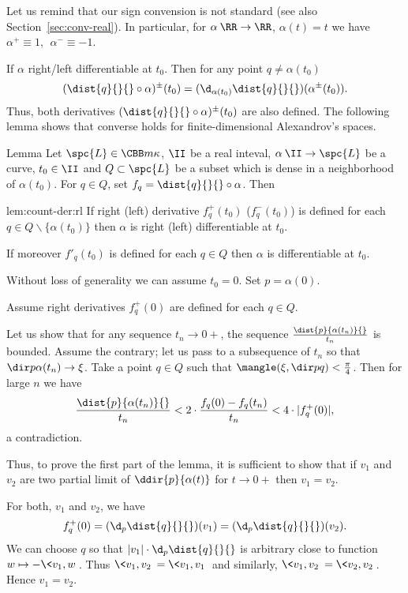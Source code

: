 Let us remind that our sign convension is not standard (see also Section~\ref{sec:conv-real}). 
In particular, for $\alpha\:\RR\to \RR$, $\alpha(t)=t$ we have $\alpha^+\equiv 1,\ \ \alpha^-\equiv -1$.

If $\alpha$ right/left differentiable at $t_0$.
Then for any point $q\not=\alpha(t_0)$
\[(\dist{q}{}{}\circ\alpha)^\pm(t_0)
=
(\d_{\alpha(t_0)}\dist{q}{}{})(\alpha^\pm(t_0)).\]
Thus, both derivatives $(\dist{q}{}{}\circ\alpha)^\pm(t_0)$ are also defined.
The following lemma shows that converse holds for finite-dimensional Alexandrov's spaces.


\begin{thm}{Lemma}\label{lem:count-der}
Let $\spc{L}\in\CBB m\kappa$,
$\II$ be a real inteval,
$\alpha\:\II\to \spc{L}$ be a curve,
$t_0\in\II$ 
and $Q\subset \spc{L}$ be a subset which is dense in a neighborhood of $\alpha(t_0)$.
For $q\in Q$, set $f_q=\dist{q}{}{}\circ\alpha$.
Then 
\begin{subthm}{lem:count-der:rl}
If right (left) derivative $f^+_q(t_0)$ ($f^-_q(t_0)$) is defined for each $q\in Q\backslash \{\alpha(t_0)\}$ then $\alpha$ is right (left) differentiable at $t_0$.
\end{subthm}

\begin{subthm}{} If moreover $f'_q(t_0)$ is defined for each $q\in Q$ then $\alpha$ is differentiable at $t_0$.
\end{subthm}
\end{thm}



Without loss of generality we can assume $t_0=0$. Set $p=\alpha(0)$.

Assume right derivatives $f^+_q(0)$ are defined for each $q\in Q$.

Let us show that for any sequence $t_n\to 0+$, the sequence $\frac{\dist{p}{\alpha(t_n)}{}}{t_n}$ is bounded.
Assume the contrary;
let us pass to a subsequence of $t_n$ so that $\dir p{\alpha(t_n)}\to\xi$.
Take a point $q\in Q$ such that $\mangle(\xi,\dir p q)<\tfrac\pi4$.
Then for large $n$ we have 
\[\frac{\dist{p}{\alpha(t_n)}{}}{t_n}
<
2\cdot\frac{f_q(0)-f_q(t_n)}{t_n}
<
4\cdot|f^+_q(0)|,\] a 
contradiction.

Thus, to prove the first part of the lemma, 
it is sufficient to show that if $v_1$ and $v_2$ are two partial limit of $\ddir{p}{\alpha(t)}$ for $t\to 0+$ then $v_1=v_2$.

For both, $v_1$ and $v_2$, we have
\[f_q^+(0)=(\d_p\dist{q}{}{})(v_1)=(\d_p\dist{q}{}{})(v_2).\]
We can choose $q$ so that $|v_1|\cdot\d_p\dist{q}{}{}$ is arbitrary close to function $w\mapsto -\<v_1,w\>$.
Thus $\<v_1,v_2\>=\<v_1,v_1\>$ and similarly, $\<v_1,v_2\>=\<v_2,v_2\>$. 
Hence $v_1=v_2$.
\qeds

